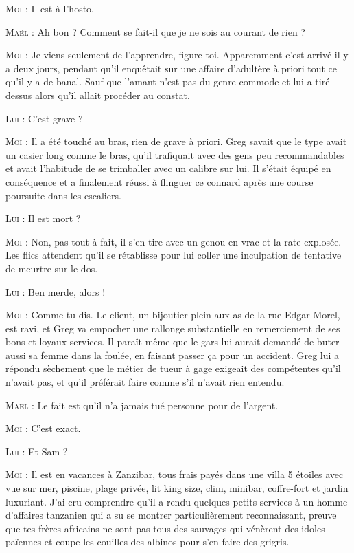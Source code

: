 \begin{dialogue}

\textsc{Moi} : Il est à l’hosto.

\textsc{Maël} : Ah bon ? Comment se fait-il que je ne sois au courant de rien ?

\textsc{Moi} : Je viens seulement de l’apprendre, figure-toi. Apparemment c’est arrivé il y a deux jours, pendant qu’il enquêtait sur une affaire d’adultère à priori tout ce qu’il y a de banal. Sauf que l’amant n’est pas du genre commode et lui a tiré dessus alors qu’il allait procéder au constat.

\textsc{Lui} : C’est grave ?

\textsc{Moi} : Il a été touché au bras, rien de grave à priori. Greg savait que le type avait un casier long comme le bras, qu’il trafiquait avec des gens peu recommandables et avait l’habitude de se trimballer avec un calibre sur lui. Il s’était équipé en conséquence et a finalement réussi à flinguer ce connard après une course poursuite dans les escaliers.

\textsc{Lui} : Il est mort ?

\textsc{Moi} : Non, pas tout à fait, il s’en tire avec un genou en vrac et la rate explosée. Les flics attendent qu’il se rétablisse pour lui coller une inculpation de tentative de meurtre sur le dos.

\textsc{Lui} : Ben merde, alors !

\textsc{Moi} : Comme tu dis. Le client, un bijoutier plein aux as de la rue Edgar Morel, est ravi, et Greg va empocher une rallonge substantielle en remerciement de ses bons et loyaux services. Il paraît même que le gars lui aurait demandé de buter aussi sa femme dans la foulée, en faisant passer ça pour un accident. Greg lui a répondu sèchement que le métier de tueur à gage exigeait des compétentes qu’il n’avait pas, et qu’il préférait faire comme s’il n’avait rien entendu.

\textsc{Maël} : Le fait est qu’il n’a jamais tué personne pour de l’argent.

\textsc{Moi} : C’est exact.

\textsc{Lui} : Et Sam ?

%
%
%
\textsc{Moi} : Il est en vacances à Zanzibar, tous frais payés dans une villa 5 étoiles avec vue sur mer, piscine, plage privée, lit king size, clim, minibar, coffre-fort et jardin luxuriant. J’ai cru comprendre qu’il a rendu quelques petits services à un homme d’affaires tanzanien qui a su se montrer particulièrement reconnaissant, preuve que tes frères africains ne sont pas tous des sauvages qui vénèrent des idoles païennes et coupe les couilles des albinos pour s’en faire des grigris. 

\end{dialogue}


